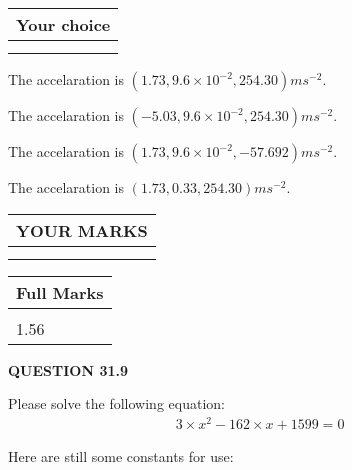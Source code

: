 \documentclass[12pt]{article}
\begin{document}
  
\noindent\hspace{3.0in} \begin{tabular}{|l|}
\hline
Your choice \\
\hline
 \\ 
 \\ 
\hline
\end{tabular}
  
  
 
 
  The accelaration is $  %
(
1.73,
9.6 \times 10^{-2},
254.30)
ms^{-2} $.
 
 
  The accelaration is $  %
(
-5.03,
9.6 \times 10^{-2},
254.30)
ms^{-2} $.
 
 
  The accelaration is $  %
(
1.73,
9.6 \times 10^{-2},
-57.692)
ms^{-2} $.
 
 
  The accelaration is $  %
(
1.73,
0.33,
254.30)
ms^{-2} $.
 
 
 

 
 
\vspace{0.3in}
  
\vspace{0.2in}
  
\noindent\begin{tabular}{|l|}
\hline
 YOUR MARKS  \\
\hline
 \\ 
 \\ 
\hline
\end{tabular}
\hspace{0.05in} \begin{tabular}{|l|}
\hline
 Full Marks  \\
\hline
 \\ 
1.56 \\
\hline
\end{tabular}
{\textbf{\Large{QUESTION
31.9 
}}}
  
  
 
 

 
Please solve the following equation:
\begin{eqnarray*}
3 \times x^2  %
-162
                 \times x    %
+  %
1599 =0
\end{eqnarray*}
 

 

 
\vspace{0.3in}
   
   
 \vspace{0.2in}
Here are still some constants for use:
 
\end{document}
